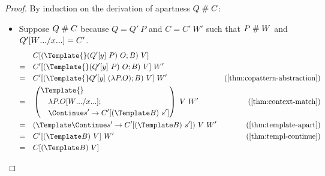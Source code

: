 \begin{proof}
  By induction on the derivation of apartness $Q \apart C$:
  \begin{itemize}
  \item Suppose $Q \apart C$ because $Q = Q' ~ P$ and $C = C' ~ W'$ such that $P \apart W$ and $Q'\subst{\many{x}}{\many{W}} = C'$.
    \begin{align*}
      & \quad
      C[(\Template{} (Q'[y] ~P) ~ O; B) ~ V]
      \\
      =& \quad
      C'[(\Template{} (Q'[y] ~P) ~ O; B) ~ V] ~W'
      \\
      =& \quad
      C'[(\Template{} Q'[y] ~(\lambda P. O); B) ~ V] ~W'
      &(\cref{thm:copattern-abstraction})
      \\
      =& \quad
      \left(
        \begin{aligned}
          &\Template{} \\
          &\quad \lambda P. O\subst{\many{x}}{\many{W}}; \\
          &\quad \Continue s' \to C'[(\Template B) ~ s']
        \end{aligned}
      \right)
      ~ V ~ W'
      & (\cref{thm:context-match})
      \\
      =& \quad
      (\Template \Continue s' \to C'[(\Template B) ~ s']) ~ V ~ W'
      & (\cref{thm:template-apart})
      \\
      =& \quad
      C'[(\Template B) ~ V] ~ W'
      & (\cref{thm:templ-continue})
      \\
      =& \quad
      C[(\Template B) ~ V]
    \end{align*}


\end{itemize}
\end{proof}
